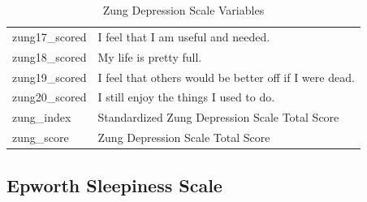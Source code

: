 \documentclass[10pt,conference,a4paper]{IEEEtran}
\begin{document}
\begin{table}[H]
\begin{tabular}{@{}p{}p{}@{}}
\multicolumn{1}{l|}{zung17\_scored} & I feel that I am useful and needed.                                 \\
\multicolumn{1}{l|}{zung18\_scored} & My life is pretty full.                                             \\
\multicolumn{1}{l|}{zung19\_scored} & I feel that others would be better off if I were dead.              \\
\multicolumn{1}{l|}{zung20\_scored} & I still enjoy the things I used to do.
            \\
\multicolumn{1}{l|}{zung\_index}    & Standardized Zung Depression Scale Total Score                      \\
\multicolumn{1}{l|}{zung\_score}    & Zung Depression Scale Total Score                                   \\ \bottomrule
\end{tabular}
\caption{Zung Depression Scale Variables}
\end{table}


\subsection{Epworth Sleepiness Scale}
\label{epworth}
\end{document}
